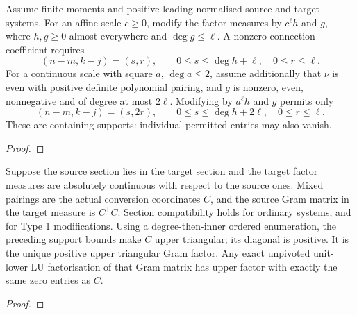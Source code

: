 \begin{theorem}
\label{thm:koornwinder-type2-support}
\leanok
Assume finite moments and positive-leading normalised source and target systems.
For an affine scale $c\ge0$, modify the factor measures by $c^\ell h$ and
$g$, where $h,g\ge0$ almost everywhere and $\deg g\le\ell$.
A nonzero connection coefficient requires
\[
 (n-m,k-j)=(s,r),\qquad 0\le s\le\deg h+\ell,\quad 0\le r\le\ell.
\]
For a continuous scale with square $a$, $\deg a\le2$, assume additionally
that $\nu$ is even with positive definite polynomial pairing, and $g$ is
nonzero, even, nonnegative and of degree at most $2\ell$.
Modifying by $a^\ell h$ and $g$ permits only
\[
 (n-m,k-j)=(s,2r),\qquad 0\le s\le\deg h+2\ell,\quad 0\le r\le\ell.
\]
These are containing supports: individual permitted entries may also vanish.
\end{theorem}
\begin{proof}
\leanok
\end{proof}

\begin{theorem}
\label{thm:koornwinder-conversion-factors}
\leanok
Suppose the source section lies in the target section and the target
factor measures are absolutely continuous with respect to the source ones.
Mixed pairings are the actual conversion coordinates $C$, and the source
Gram matrix in the target measure is $C^{\mathsf T}C$.
Section compatibility holds for ordinary systems, and for Type 1 modifications.
Using a degree-then-inner ordered enumeration, the preceding support bounds
make $C$ upper triangular; its diagonal is positive. It is the unique positive
upper triangular Gram factor. Any exact unpivoted unit-lower LU factorisation
of that Gram matrix has upper factor with exactly the same zero entries as $C$.
\end{theorem}
\begin{proof}
\leanok
\end{proof}

